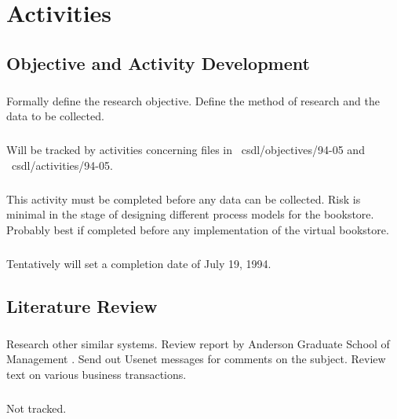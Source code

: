 \chapter{Activities}
\begin{noindent}

\section{Objective and Activity Development}

\paragraph{} Formally define the research objective.  Define the method of research and the
data to be collected.

\paragraph{}Will be tracked by activities concerning files in ~csdl/objectives/94-05 and
~csdl/activities/94-05.

\paragraph{}This activity must be completed before any data can be collected.  Risk is
minimal in the stage of designing different process models for the bookstore.
Probably best if completed before any implementation of the virtual
bookstore.

\paragraph{}Tentatively will set a completion date of July 19, 1994.


\section{Literature Review}

\paragraph{}Research other similar systems.  Review report by Anderson Graduate School of
Management \cite{bookstore-AGSM94}.  Send out Usenet messages for comments on
the subject.  Review text on various business transactions.

\paragraph{}Not tracked.


\end{noindent}
